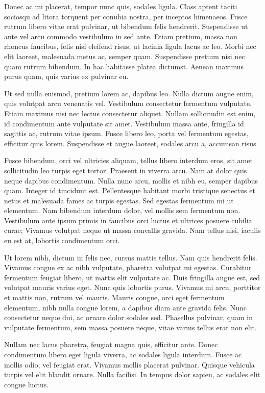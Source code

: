 \documentclass[12pt]{article}
\begin{document}
Donec ac mi placerat, tempor nunc quis, sodales ligula. Class aptent taciti sociosqu ad litora torquent per conubia nostra, per inceptos himenaeos. Fusce rutrum libero vitae erat pulvinar, ut bibendum felis hendrerit. Suspendisse ut ante vel arcu commodo vestibulum in sed ante. Etiam pretium, massa non rhoncus faucibus, felis nisi eleifend risus, ut lacinia ligula lacus ac leo. Morbi nec elit laoreet, malesuada metus ac, semper quam. Suspendisse pretium nisi nec quam rutrum bibendum. In hac habitasse platea dictumst. Aenean maximus purus quam, quis varius ex pulvinar eu.

Ut sed nulla euismod, pretium lorem ac, dapibus leo. Nulla dictum augue enim, quis volutpat arcu venenatis vel. Vestibulum consectetur fermentum vulputate. Etiam maximus nisi nec lectus consectetur aliquet. Nullam sollicitudin est enim, id condimentum ante vulputate sit amet. Vestibulum massa ante, fringilla id sagittis ac, rutrum vitae ipsum. Fusce libero leo, porta vel fermentum egestas, efficitur quis lorem. Suspendisse et augue laoreet, sodales arcu a, accumsan risus.

Fusce bibendum, orci vel ultricies aliquam, tellus libero interdum eros, sit amet sollicitudin leo turpis eget tortor. Praesent in viverra arcu. Nam at dolor quis neque dapibus condimentum. Nulla nunc arcu, mollis et nibh eu, semper dapibus quam. Integer id tincidunt est. Pellentesque habitant morbi tristique senectus et netus et malesuada fames ac turpis egestas. Sed egestas fermentum mi ut elementum. Nam bibendum interdum dolor, vel mollis sem fermentum non. Vestibulum ante ipsum primis in faucibus orci luctus et ultrices posuere cubilia curae; Vivamus volutpat neque ut massa convallis gravida. Nam tellus nisi, iaculis eu est at, lobortis condimentum orci.

Ut lorem nibh, dictum in felis nec, cursus mattis tellus. Nam quis hendrerit felis. Vivamus congue ex ac nibh vulputate, pharetra volutpat mi egestas. Curabitur fermentum feugiat libero, ut mattis elit vulputate ac. Duis fringilla augue est, sed volutpat mauris varius eget. Nunc quis lobortis purus. Vivamus mi arcu, porttitor et mattis non, rutrum vel mauris. Mauris congue, orci eget fermentum elementum, nibh nulla congue lorem, a dapibus diam ante gravida felis. Nunc consectetur neque dui, ac ornare dolor sodales sed. Phasellus pulvinar, quam in vulputate fermentum, sem massa posuere neque, vitae varius tellus erat non elit.

Nullam nec lacus pharetra, feugiat magna quis, efficitur ante. Donec condimentum libero eget ligula viverra, ac sodales ligula interdum. Fusce ac mollis odio, vel feugiat erat. Vivamus mollis placerat pulvinar. Quisque vehicula turpis vel elit blandit ornare. Nulla facilisi. In tempus dolor sapien, ac sodales elit congue luctus.
\end{document}
